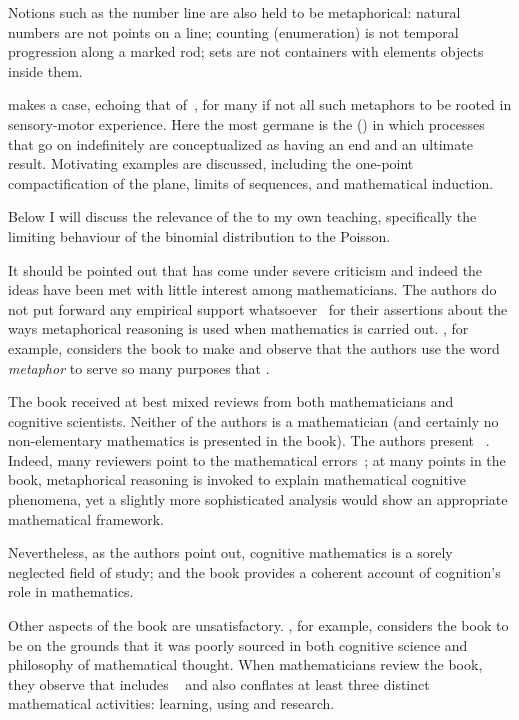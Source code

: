 Notions such as the number line are also held to be metaphorical:
natural numbers are not points on a line; counting (enumeration) is
not temporal progression along a marked rod; sets are not containers
with elements objects inside them.

\wmcf makes a case, echoing that of~, for many if not
all such metaphors to be rooted in sensory-motor experience.  Here the
most germane is the  (\bmi) in
which processes that go on indefinitely are conceptualized as having
an end and an ultimate result.  Motivating examples are discussed,
including the one-point compactification of the plane, limits of
sequences, and mathematical induction.

Below I will discuss the relevance of the \bmi to my own teaching,
specifically the limiting behaviour of the binomial distribution to
the Poisson.

It should be pointed out that \wmcf has come under severe criticism
and indeed the ideas have been met with little interest among
mathematicians.  The authors do not put forward any empirical support
whatsoever~\parencite{madden2001} for their assertions about the ways
metaphorical reasoning is used when mathematics is carried out.
, for example, considers the book to make
 and observe that the authors
use the word \emph{metaphor} to serve so many purposes that
.

The book received at best mixed reviews from both mathematicians and
cognitive scientists.  Neither of the authors is a mathematician (and
certainly no non-elementary mathematics is presented in the book).
The authors present ~\parencite{henderson2002}.
Indeed, many reviewers point to the 
mathematical errors~\parencite{gold2001}; at many points in the book,
metaphorical reasoning is invoked to explain mathematical cognitive
phenomena, yet a slightly more sophisticated analysis would show an
appropriate mathematical framework.

Nevertheless, as the authors point out, cognitive mathematics is a
sorely neglected field of study; and the book provides a coherent
account of cognition's role in mathematics.

Other aspects of the book are unsatisfactory.  , for
example, considers the book to be  on the
grounds that it was poorly sourced in both cognitive science and
philosophy of mathematical thought.  When mathematicians review the
book, they observe that \wmcf includes ~\parencite{henderson2002} and also conflates at
least three distinct mathematical activities: learning, using and
research.

